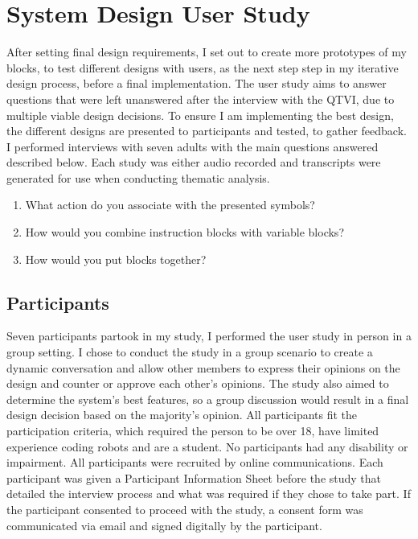 \documentclass[oneside,%
                    author={Malak Hajji},
                    degree={BSc},
                    title={Designing An Accessible Computational Toolkit For Students},
                  subtitle={With Mixed Visual Abilities}]{dissertation}
\begin{document}
\section{System Design User Study}
After setting final design requirements, I set out to create more prototypes of my blocks, to test different designs with users, as the next step step in my iterative design process, before a final implementation. 
The user study aims to answer questions that were left unanswered after the interview with the QTVI, due to multiple viable design decisions.
To ensure I am implementing the best design, the different designs are presented to participants and tested, to gather feedback.  I performed interviews with seven adults with the main questions answered described below. Each study was either audio recorded and transcripts were generated for use when conducting thematic analysis.

\begin{enumerate}
    \item What action do you associate with the presented symbols?
    \item How would you combine instruction blocks with variable blocks?
    \item How would you put blocks together?
   
    
\end{enumerate}
\subsection{Participants}

Seven participants partook in my study, I performed the user study in person in a group setting. I chose to conduct the study in a group scenario to create a dynamic conversation and allow other members to express their opinions on the design and counter or approve each other's opinions. The study also aimed to determine the system's best features, so a group discussion would result in a final design decision based on the majority's opinion.  All participants fit the participation criteria, which required the person to be over 18, have limited experience coding robots and are a student. No participants had any disability or impairment.
All participants were recruited by online communications. Each participant was given a Participant Information Sheet before the study that detailed the interview process and what was required if they chose to take part. If the participant consented to proceed with the study, a consent form was communicated via email and signed digitally by the participant. 
\end{document}
